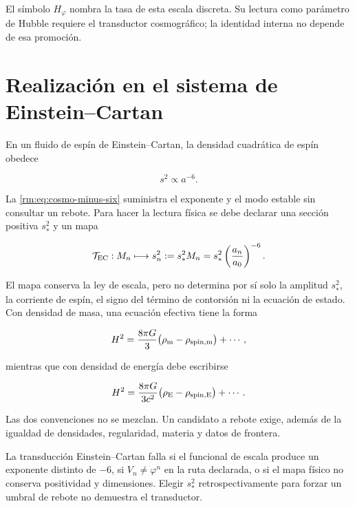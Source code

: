El s\'imbolo \(H_\varphi\) nombra la tasa de esta escala discreta. Su lectura
como par\'ametro de Hubble requiere el transductor cosmogr\'afico; la identidad
interna no depende de esa promoci\'on.

\section{Realizaci\'on en el sistema de Einstein--Cartan}

En un fluido de esp\'in de Einstein--Cartan, la densidad cuadr\'atica de esp\'in
obedece

\begin{equation}
s^2\propto a^{-6}.
\label{rm:eq:cosmo-EC-scaling}
\end{equation}

La \cref{rm:eq:cosmo-minus-six} suministra el exponente y el modo estable sin
consultar un rebote. Para hacer la lectura f\'isica se debe declarar una
secci\'on positiva \(s_*^2\) y un mapa

\begin{equation}
\mathcal T_{\rm EC}:M_n\longmapsto
s_n^2:=s_*^2M_n
=s_*^2\left(\frac{a_n}{a_0}\right)^{-6}.
\label{rm:eq:cosmo-EC-transducer}
\end{equation}

El mapa conserva la ley de escala, pero no determina por s\'i solo la amplitud
\(s_*^2\), la corriente de esp\'in, el signo del t\'ermino de contorsi\'on ni la
ecuaci\'on de estado. Con densidad de masa, una ecuaci\'on efectiva tiene la
forma

\begin{equation}
H^2=\frac{8\pi G}{3}
\bigl(\rho_{\rm m}-\rho_{\rm spin,m}\bigr)+\cdots,
\label{rm:eq:cosmo-EC-mass}
\end{equation}

mientras que con densidad de energ\'ia debe escribirse

\begin{equation}
H^2=\frac{8\pi G}{3c^2}
\bigl(\rho_{\rm E}-\rho_{\rm spin,E}\bigr)+\cdots.
\label{rm:eq:cosmo-EC-energy}
\end{equation}

Las dos convenciones no se mezclan. Un candidato a rebote exige, adem\'as de
la igualdad de densidades, regularidad, materia y datos de frontera.

\begin{falsifier}
La transducci\'on Einstein--Cartan falla si el funcional de escala produce un
exponente distinto de \(-6\), si \(V_n\ne\varphi^n\) en la ruta declarada, o
si el mapa f\'isico no conserva positividad y dimensiones. Elegir
\(s_*^2\) retrospectivamente para forzar un umbral de rebote no demuestra el
transductor.
\end{falsifier}

